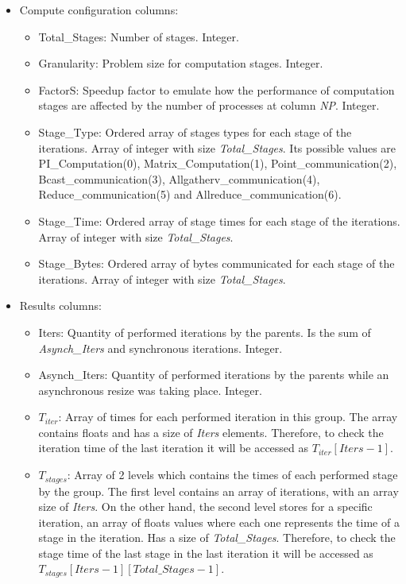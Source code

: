 \begin{itemize}
    \item Compute configuration columns:
    \begin{itemize}
        \item Total\_Stages: Number of stages. Integer.
        \item Granularity: Problem size for computation stages. Integer.
        \item FactorS: Speedup factor to emulate how the performance of computation stages are affected by the number of processes at column \textit{NP}. Integer.
        \item Stage\_Type: Ordered array of stages types for each stage of the iterations. Array of integer with size \textit{Total\_Stages}. Its possible values are PI\_Computation(0), Matrix\_Computation(1), Point\_communication(2), Bcast\_communication(3), Allgatherv\_communication(4), Reduce\_communication(5) and Allreduce\_communication(6).
        \item Stage\_Time: Ordered array of stage times for each stage of the iterations. Array of integer with size \textit{Total\_Stages}.
        \item Stage\_Bytes: Ordered array of bytes communicated for each stage of the iterations. Array of integer with size \textit{Total\_Stages}.
    \end{itemize}
    
    \item Results columns:
    \begin{itemize}
        \item Iters: Quantity of performed iterations by the parents. Is the sum of \textit{Asynch\_Iters} and synchronous iterations. Integer.
        \item Asynch\_Iters: Quantity of performed iterations by the parents while an asynchronous resize was taking place. Integer.
        \item $T_{iter}$: Array of times for each performed iteration in this group. The array contains floats and has a size of \textit{Iters} elements. 
        Therefore, to check the iteration time of the last iteration it will be accessed as $T_{iter}[Iters-1]$.
        \item $T_{stages}$: Array of 2 levels which contains the times of each performed stage by the group. The first level contains an array of iterations, with an array size of \textit{Iters}. On the other hand, the second level stores for a specific iteration, an array of floats values where each one represents the time of a stage in the iteration. Has a size of \textit{Total\_Stages}.
        Therefore, to check the stage time of the last stage in the last iteration it will be accessed as $T_{stages}[Iters-1][Total\_Stages-1]$.
        

\end{itemize}
\end{itemize}
